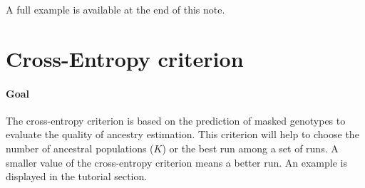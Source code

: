 \documentclass[10pt,a4paper]{article}
\begin{document}
\noindent
A full example is available at the end of this note.

\section{Cross-Entropy criterion}

\paragraph{Goal}
The cross-entropy criterion is based on the prediction of masked genotypes to evaluate
the quality of ancestry estimation. This criterion will help to choose the 
number of ancestral populations ($K$) or the best run among a set of runs. A smaller value
of the cross-entropy criterion means a better run. An example is displayed in the tutorial section.
\end{document}
